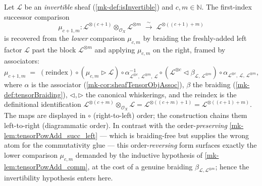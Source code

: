 \begin{lemma}\label{mk-lem:tensorPowAdd_succ_left_braided}
  \leanok

  Let \(\mathcal{L}\) be an \emph{invertible} sheaf (\ref{mk-def:isInvertible}) and
  \(c, m \in \mathbb{N}\). The first-index successor comparison
  \[
    \mu_{c+1,m} : \mathcal{L}^{\otimes(c+1)} \otimes_{\mathcal{O}_X}
      \mathcal{L}^{\otimes m} \;\xrightarrow{\ \sim\ }\;
      \mathcal{L}^{\otimes((c+1)+m)}
  \]
  is recovered from the \emph{lower} comparison \(\mu_{c,m}\) by braiding the
  freshly-added left factor \(\mathcal{L}\) past the block \(\mathcal{L}^{\otimes
  m}\) and applying \(\mu_{c,m}\) on the right, framed by associators:
  \[
    \mu_{c+1,m}
      \;=\;
      (\text{reindex})\circ
      (\mu_{c,m} \rhd \mathcal{L})\circ
      \alpha^{-1}_{\mathcal{L}^{\otimes c},\,\mathcal{L}^{\otimes m},\,\mathcal{L}}\circ
      (\mathcal{L}^{\otimes c} \lhd \beta_{\mathcal{L},\,\mathcal{L}^{\otimes m}})\circ
      \alpha_{\mathcal{L}^{\otimes c},\,\mathcal{L},\,\mathcal{L}^{\otimes m}},
  \]
  where \(\alpha\) is the associator (\ref{mk-cor:sheafTensorObjAssoc}), \(\beta\)
  the braiding (\ref{mk-def:tensorBraiding}), \(\lhd,\rhd\) the canonical
  whiskerings, and the reindex is the definitional identification
  \(\mathcal{L}^{\otimes(c+m)}\otimes_{\mathcal{O}_X}\mathcal{L} =
  \mathcal{L}^{\otimes((c+m)+1)} = \mathcal{L}^{\otimes((c+1)+m)}\). The maps are
  displayed in \(\circ\) (right-to-left) order; the construction chains them
  left-to-right (diagrammatic order). In contrast with the
  order-\emph{preserving} \ref{mk-lem:tensorPowAdd_succ_left} --- which is
  braiding-free but supplies the wrong atom for the commutativity glue --- this
  order-\emph{reversing} form surfaces exactly the lower comparison \(\mu_{c,m}\)
  demanded by the inductive hypothesis of \ref{mk-lem:tensorPowAdd_comm}, at the
  cost of a genuine braiding \(\beta_{\mathcal{L},\mathcal{L}^{\otimes m}}\);
  hence the invertibility hypothesis enters here.
\end{lemma}


